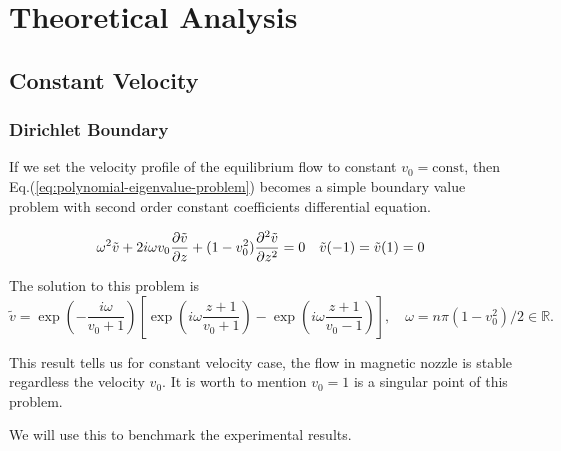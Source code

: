 \chapter{Theoretical Analysis} \label{chap:theoretical-analysis}
\section{Constant Velocity}
\subsection{Dirichlet Boundary}
If we set the velocity profile of the equilibrium flow to constant $v_0=\text{const}$, then Eq.(\ref{eq:polynomial-eigenvalue-problem}) becomes a simple boundary value problem with second order constant coefficients differential equation.

\begin{equation} \label{eq:constant-v-problem-dirichlet}
    \omega^2\tilde{v} + 2i\omega v_0\pdv{\tilde{v}}{z} + (1-v_0^2)\pdv[2]{\tilde{v}}{z} = 0
    \quad
    \tilde{v}(-1) = \tilde{v}(1) = 0
\end{equation}

The solution to this problem is
\begin{equation} \label{eq:constant-v-solution-dirichlet}
    \tilde{v} = \exp\left(-\frac{i\omega}{v_0+1}\right)
\left[ \exp\left(i\omega\frac{z+1}{v_0+1}\right) - \exp\left(i\omega\frac{z+1}{v_0-1}\right) \right], \quad \omega=n\pi(1-v_0^2)/2 \in \mathbb{R}.
\end{equation}

This result tells us for constant velocity case, the flow in magnetic nozzle is stable regardless the velocity $v_0$. It is worth to mention $v_0=1$ is a singular point of this problem.

We will use this to benchmark the experimental results. 

